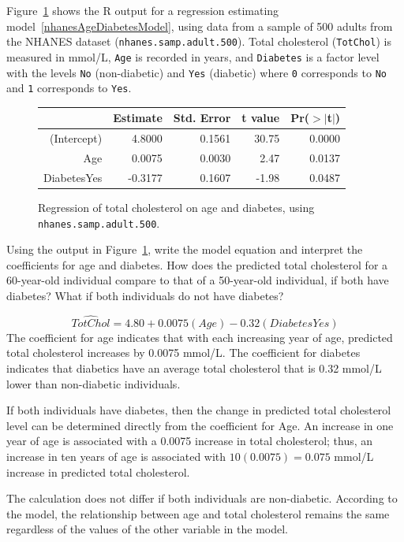 Figure~\ref{nhanesAgeDiabetes} shows the \textsf{R} output for a regression estimating model~\ref{nhanesAgeDiabetesModel}, using data from a sample of 500 adults from the NHANES dataset (\texttt{nhanes.samp.adult.500}). Total cholesterol (\texttt{TotChol}) is measured in mmol/L, \texttt{Age} is recorded in years, and \texttt{Diabetes} is a factor level with the levels \texttt{No} (non-diabetic) and \texttt{Yes} (diabetic) where \texttt{0} corresponds to \texttt{No} and \texttt{1} corresponds to \texttt{Yes}.

\begin{figure}[ht]
	\centering
	\begin{tabular}{rrrrr}
		\hline
		& Estimate & Std. Error & t value & Pr($>$$|$t$|$) \\ 
		\hline
		(Intercept) & 4.8000 & 0.1561 & 30.75 & 0.0000 \\ 
		Age & 0.0075 & 0.0030 & 2.47 & 0.0137 \\ 
		DiabetesYes & -0.3177 & 0.1607 & -1.98 & 0.0487 \\ 
		\hline
	\end{tabular}
	\caption{Regression of total cholesterol on age and diabetes, 
		using \texttt{nhanes.samp.adult.500}.} 
	\label{nhanesAgeDiabetes}
\end{figure}

\textD{\newpage}

\begin{examplewrap}
\begin{nexample}{Using the output in Figure~\ref{nhanesAgeDiabetes}, write the model equation and interpret the coefficients for age and diabetes. How does the predicted total cholesterol for a 60-year-old individual compare to that of a 50-year-old individual, if both have diabetes? What if both individuals do not have diabetes?}
	
\[\widehat{TotChol} = 4.80 + 0.0075(Age) - 0.32(DiabetesYes) \]	
The coefficient for age indicates that with each increasing year of age, predicted total cholesterol increases by 0.0075 mmol/L. The coefficient for diabetes indicates that diabetics have an average total cholesterol that is 0.32 mmol/L lower than non-diabetic individuals. 

If both individuals have diabetes, then the change in predicted total cholesterol level can be determined directly from the coefficient for Age. An increase in one year of age is associated with a 0.0075 increase in total cholesterol; thus, an increase in ten years of age is associated with $10(0.0075) = 0.075$ mmol/L increase in predicted total cholesterol.

The calculation does not differ if both individuals are non-diabetic. According to the model, the relationship between age and total cholesterol remains the same regardless of the values of the other variable in the model. 
\end{nexample}
\end{examplewrap}


